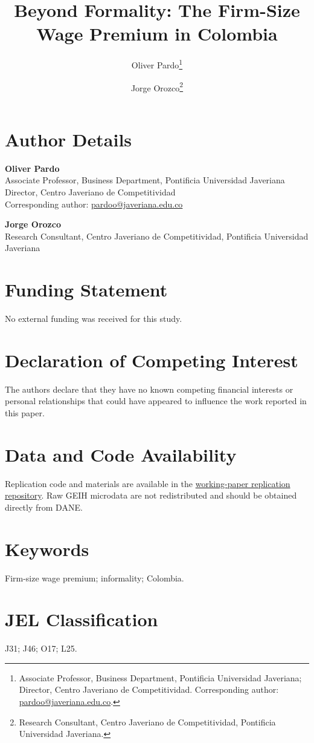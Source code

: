 \documentclass[12pt]{article}
\title{Beyond Formality: The Firm-Size Wage Premium in Colombia}
\author{
Oliver Pardo\thanks{Associate Professor, Business Department, Pontificia Universidad Javeriana; Director, Centro Javeriano de Competitividad. Corresponding author: \href{mailto:pardoo@javeriana.edu.co}{pardoo@javeriana.edu.co}.}
\and
Jorge Orozco\thanks{Research Consultant, Centro Javeriano de Competitividad, Pontificia Universidad Javeriana.}
}
\date{}
\begin{document}
\maketitle

\section*{Author Details}

\noindent\textbf{Oliver Pardo}\\
Associate Professor, Business Department, Pontificia Universidad Javeriana\\
Director, Centro Javeriano de Competitividad\\
Corresponding author: \href{mailto:pardoo@javeriana.edu.co}{pardoo@javeriana.edu.co}

\vspace{0.7cm}

\noindent\textbf{Jorge Orozco}\\
Research Consultant, Centro Javeriano de Competitividad, Pontificia Universidad Javeriana

\section*{Funding Statement}

No external funding was received for this study.

\section*{Declaration of Competing Interest}

The authors declare that they have no known competing financial interests or personal relationships that could have appeared to influence the work reported in this paper.

\section*{Data and Code Availability}

Replication code and materials are available in the
\href{https://github.com/Kin-George/CJC-Monitor/tree/working-paper-v1-2026-06-13}{working-paper replication repository}.
Raw GEIH microdata are not redistributed and should be obtained directly from DANE.

\section*{Keywords}

Firm-size wage premium; informality; Colombia.

\section*{JEL Classification}

J31; J46; O17; L25.
\end{document}
